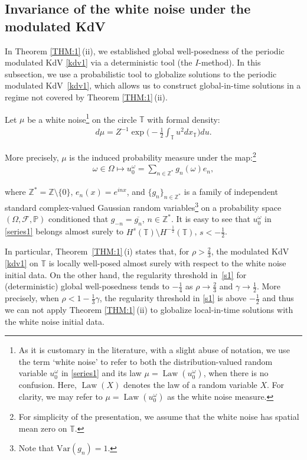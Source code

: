 \documentclass[letterpaper, 11pt,  reqno]{amsart}
\DeclareMathOperator{\Law}{Law}
\newcommand{\1}{\hspace{0.5mm}\text{I}\hspace{0.5mm}}
\newcommand{\noi}{\noindent}
\newcommand{\Z}{\mathbb{Z}}
\newcommand{\T}{\mathbb{T}}
\newcommand{\PP}{\mathbb{P}}
\newcommand{\F}{\mathcal{F}}
\newcommand{\g}{\gamma}
\newcommand{\cj}{\overline}
\renewcommand{\o}{\omega}
\renewcommand{\O}{\Omega}
\numberwithin{equation}{section}
\numberwithin{theorem}{section}
\begin{document}
\subsection{Invariance of the white noise under the modulated KdV}
\label{SUBSEC:1.5}

In Theorem \ref{THM:1}\,(ii), 
we established global well-posedness
of the periodic modulated KdV \eqref{kdv1}
 via a deterministic tool (the $I$-method).
In this subsection, 
we use a probabilistic tool 
to globalize solutions to 
 the periodic modulated KdV~\eqref{kdv1},
 which allows us to construct global-in-time solutions
 in a regime not covered by 
Theorem \ref{THM:1}\,(ii).



Let $\mu$ be  
a  white noise\footnote{As it is customary in the literature, 
with a slight abuse of notation, 
we use the term `white noise' to refer to both the distribution-valued random variable $u_0^\o$ in \eqref{series1}
and its law $\mu = \Law (u_0^\o)$, when there is no confusion.
Here, $\Law(X)$ denotes the law of a random variable $X$.
For clarity, we may refer to $\mu = \Law (u_0^\o)$ as the white noise measure.} 
on the circle $\T$ with formal density:
\begin{align}
d\mu = Z^{-1} \exp\bigg(- \frac 12 \int_\T u^2 dx_\T\bigg) du.
\label{white1}
\end{align}

\noi
More precisely, $\mu$ is the induced probability
measure
under the map:\footnote{For simplicity of
the presentation, we assume that the white noise has spatial mean zero on $\T$.} 
\begin{align}
\o \in \O \longmapsto
u_0^\o = \sum_{n \in \Z^*} g_n(\o) e_n, 
\label{series1}
\end{align}


\noi
where $\Z^* = \Z \setminus \{0\}$, 
$e_n(x) = e^{ i n  x}$,  and 
$\{g_n \}_{n \in \Z^*}$ is a family of independent standard 
complex-valued Gaussian random variables\footnote{Note that $\text{Var}(g_n) = 1$.} 
on a probability space $(\O, \F, \PP)$
conditioned that $g_{-n} = \cj{g_n}$, $n \in \Z^*$.
It is easy to see that 
$u_0^\o$ in  \eqref{series1} belongs almost surely to $H^s(\T) \setminus H^{-\frac 12} (\T)$, $s < - \frac 12$.





In particular, 
Theorem~\ref{THM:1}\,(i)
states that, for $\rho > \frac 23$, 
the modulated KdV  \eqref{kdv1} on $\T$
is locally well-posed almost surely with respect to the white noise initial data.
On the other hand, 
the  regularity threshold 
in~\eqref{s1} for (deterministic)
global well-posedness tends to $- \frac 14$
as $\rho \to \frac 23$ and $\g \to \frac 12$.
More precisely, 
when $ \rho < 1 - \frac 13 \g$, 
the regularity threshold in \eqref{s1} is above $- \frac 12$
and thus 
we can not apply Theorem \ref{THM:1}\,(ii)
to globalize local-in-time solutions with the  white noise initial data.
\end{document}
